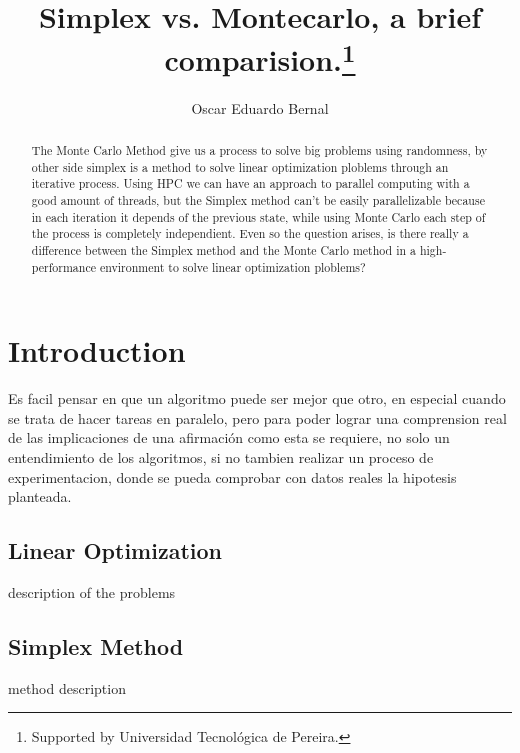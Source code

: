 \documentclass[runningheads]{llncs}
\begin{document}
%
\title{Simplex vs. Montecarlo, a brief comparision.\thanks{Supported by Universidad Tecnológica de Pereira.}}
%
%
\author{Oscar Eduardo Bernal}
%
%
%
\maketitle              %
%
\begin{abstract}
The Monte Carlo Method give us a process to solve big problems using randomness, by other side simplex is a method to solve linear optimization ploblems through an iterative process. Using HPC we can have an approach to parallel computing with a good amount of threads, but the Simplex method can't be easily parallelizable because in each iteration it depends of the previous state, while using Monte Carlo each step of the process is completely independient. Even so the question arises, is there really a difference between the Simplex method and the Monte Carlo method in a high-performance environment to solve linear optimization ploblems?

\end{abstract}
%
%
%
\section{Introduction}
Es facil pensar en que un algoritmo puede ser mejor que otro, en especial cuando se trata de hacer tareas en paralelo, pero para poder lograr una comprension real de las implicaciones de una afirmación como esta se requiere, no solo un entendimiento de los algoritmos, si no tambien realizar un proceso de experimentacion, donde se pueda comprobar con datos reales la hipotesis planteada.

\subsection{Linear Optimization}
description of the problems

\subsection{Simplex Method}
method description
\end{document}

